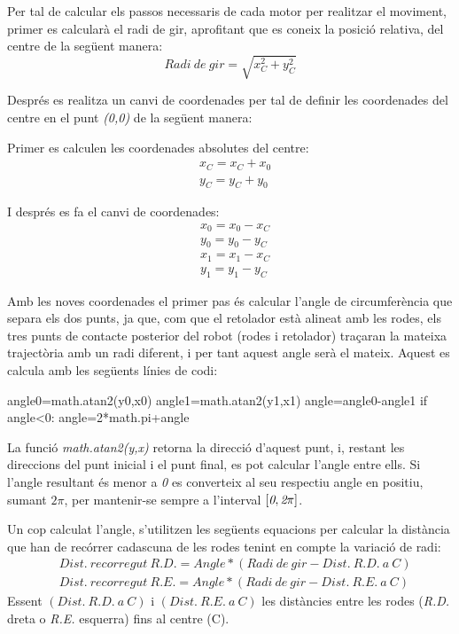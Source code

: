 Per tal de calcular els passos necessaris de cada motor per realitzar el moviment, primer es calcularà el radi de gir, aprofitant que es coneix la posició relativa, del centre de la següent manera:
\begin{equation}
Radi \ de \ gir = \sqrt{x_{C}^2+y_{C}^2}
\end{equation}


Després es realitza un canvi de coordenades per tal de definir les coordenades del centre en el punt \emph{(0,0)} de la següent manera:

Primer es calculen les coordenades absolutes del centre:
\begin{eqnarray}
\nonumber & x_{C}=x_{C}+x_{0} \\
& y_{C}=y_{C}+y_{0}
\end{eqnarray}

I després es fa el canvi de coordenades:
\begin{eqnarray}
\nonumber & x_{0}=x_{0}-x_{C} \\
\nonumber & y_{0}=y_{0}-y_{C} \\
\nonumber & x_{1}=x_{1}-x_{C} \\
& y_{1}=y_{1}-y_{C}
\end{eqnarray}

Amb les noves coordenades el primer pas és calcular l’angle de circumferència que separa els dos punts, ja que, com que el retolador està alineat amb les rodes, els tres punts de contacte posterior del robot (rodes i retolador) traçaran la mateixa trajectòria amb un radi diferent, i per tant aquest angle serà el mateix. Aquest es calcula amb les següents línies de codi:

\begin{python}
angle0=math.atan2(y0,x0)
angle1=math.atan2(y1,x1)
angle=angle0-angle1
if angle<0:
angle=2*math.pi+angle
\end{python}

La funció \emph{math.atan2(y,x)} retorna la direcció d’aquest punt, i, restant les direccions del punt inicial i el punt final, es pot calcular l'angle entre ells. Si l’angle resultant és menor a \emph{0} es converteix al seu respectiu angle en positiu, sumant $2\pi$, per mantenir-se sempre a l’interval $[\emph{0},\emph{2} \pi]$.

Un cop calculat l’angle, s’utilitzen les següents equacions per calcular la distància que han de recórrer cadascuna de les rodes tenint en compte la variació de radi:
\begin{eqnarray}
\nonumber &Dist. \ recorregut \ R.D. = Angle * (Radi \ de \ gir-Dist. \ R.D. \ a \ C) \\ 
&Dist. \ recorregut \ R.E. = Angle * (Radi \ de \ gir-Dist. \ R.E. \ a \ C)
\end{eqnarray}
Essent  $(Dist. \ R.D. \ a \ C)$ i $(Dist. \ R.E. \ a \ C)$ les distàncies entre les rodes (\emph{R.D.} dreta o \emph{R.E.} esquerra) fins al centre (C).

